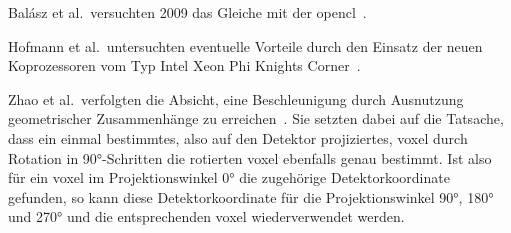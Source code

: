 Balász et al.\ versuchten 2009 das Gleiche mit der \gls{opencl}~\cite{balgab}.

Hofmann et al.\ untersuchten eventuelle Vorteile durch den Einsatz der neuen Koprozessoren vom Typ 
Intel{\textregistered} Xeon Phi{\texttrademark} {\glq}Knights Corner{\grq}~\cite{hoftrei}.

Zhao et al.\ verfolgten die Absicht, eine Beschleunigung durch Ausnutzung geometrischer Zusammenhänge zu
erreichen~\cite{zhao}. Sie setzten dabei auf die Tatsache, dass ein einmal bestimmtes, also auf den Detektor
projiziertes, \gls{voxel} durch Rotation in 90°-Schritten die rotierten \gls{voxel} ebenfalls genau bestimmt. Ist also
für ein \gls{voxel} im Projektionswinkel 0° die zugehörige Detektorkoordinate gefunden, so kann diese Detektorkoordinate
für die Projektionswinkel 90°, 180° und 270° und die entsprechenden \gls{voxel} wiederverwendet werden.
